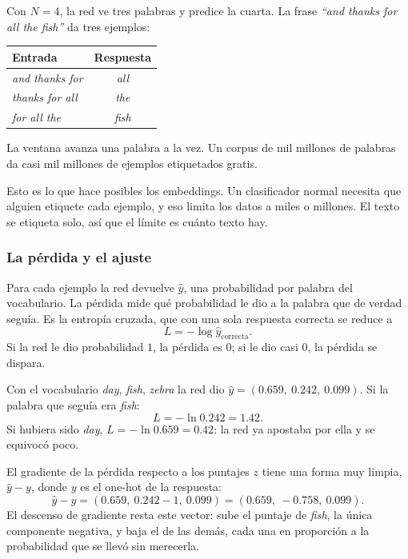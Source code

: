 \documentclass[11pt,letterpaper]{article}
\begin{document}
\begin{ejemplo}
    Con $N = 4$, la red ve tres palabras y predice la cuarta. La frase
    \textit{``and thanks for all the fish''} da tres ejemplos:
    \begin{center}
    \begin{tabular}{lc}
        \toprule
        \textbf{Entrada} & \textbf{Respuesta} \\
        \midrule
        \textit{and thanks for} & \textit{all}  \\
        \textit{thanks for all} & \textit{the}  \\
        \textit{for all the}    & \textit{fish} \\
        \bottomrule
    \end{tabular}
    \end{center}
    La ventana avanza una palabra a la vez. Un corpus de mil millones
    de palabras da casi mil millones de ejemplos etiquetados gratis.
\end{ejemplo}

\begin{idea}
    Esto es lo que hace posibles los embeddings. Un clasificador
    normal necesita que alguien etiquete cada ejemplo, y eso limita los
    datos a miles o millones. El texto se etiqueta solo, así que el
    límite es cuánto texto hay.
\end{idea}

\subsubsection*{La pérdida y el ajuste}

Para cada ejemplo la red devuelve $\hat{y}$, una probabilidad por
palabra del vocabulario. La pérdida mide qué probabilidad le dio a la
palabra que de verdad seguía. Es la entropía cruzada, que con una sola
respuesta correcta se reduce a
\[
    L = -\log \hat{y}_{\text{correcta}} .
\]
Si la red le dio probabilidad $1$, la pérdida es $0$; si le dio casi
$0$, la pérdida se dispara.

\begin{ejemplo}
    Con el vocabulario \textit{day}, \textit{fish}, \textit{zebra} la
    red dio $\hat{y} = (0.659,\ 0.242,\ 0.099)$. Si la palabra que
    seguía era \textit{fish}:
    \[
        L = -\ln 0.242 = 1.42 .
    \]
    Si hubiera sido \textit{day}, $L = -\ln 0.659 = 0.42$: la red ya
    apostaba por ella y se equivocó poco.

    El gradiente de la pérdida respecto a los puntajes $z$ tiene una
    forma muy limpia, $\hat{y} - y$, donde $y$ es el one-hot de la
    respuesta:
    \[
        \hat{y} - y = (0.659,\ 0.242 - 1,\ 0.099)
                    = (0.659,\ -0.758,\ 0.099) .
    \]
    El descenso de gradiente resta este vector: sube el puntaje de
    \textit{fish}, la única componente negativa, y baja el de las
    demás, cada una en proporción a la probabilidad que se llevó sin
    merecerla.
\end{ejemplo}
\end{document}
